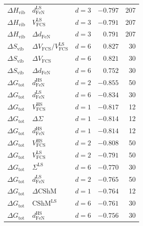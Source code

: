 \begin{longtable}{@{}lllrr@{}}
$\Delta H_{\mathrm{vib}}$ & $d_{\mathrm{FeN}}^{\mathrm{LS}}$ & $d=3$ & $-0.797$ & 207 \\
$\Delta H_{\mathrm{vib}}$ & $V_{\mathrm{FCS}}^{\mathrm{LS}}$ & $d=3$ & $-0.791$ & 207 \\
$\Delta H_{\mathrm{vib}}$ & $\Delta d_{\mathrm{FeN}}$ & $d=3$ & $0.791$ & 207 \\
\midrule
$\Delta S_{\mathrm{vib}}$ & $\Delta V_{\mathrm{FCS}}/V_{\mathrm{FCS}}^{\mathrm{LS}}$ & $d=6$ & $0.827$ & 30 \\
$\Delta S_{\mathrm{vib}}$ & $\Delta V_{\mathrm{FCS}}$ & $d=6$ & $0.821$ & 30 \\
$\Delta S_{\mathrm{vib}}$ & $\Delta d_{\mathrm{FeN}}$ & $d=6$ & $0.752$ & 30 \\
\midrule
$\Delta G_{\mathrm{tot}}$ & $d_{\mathrm{FeN}}^{\mathrm{HS}}$ & $d=2$ & $-0.855$ & 50 \\
$\Delta G_{\mathrm{tot}}$ & $d_{\mathrm{FeN}}^{\mathrm{LS}}$ & $d=6$ & $-0.834$ & 30 \\
$\Delta G_{\mathrm{tot}}$ & $V_{\mathrm{FCS}}^{\mathrm{HS}}$ & $d=1$ & $-0.817$ & 12 \\
$\Delta G_{\mathrm{tot}}$ & $\Delta\Sigma$ & $d=1$ & $-0.814$ & 12 \\
$\Delta G_{\mathrm{tot}}$ & $d_{\mathrm{FeN}}^{\mathrm{HS}}$ & $d=1$ & $-0.814$ & 12 \\
$\Delta G_{\mathrm{tot}}$ & $V_{\mathrm{FCS}}^{\mathrm{HS}}$ & $d=2$ & $-0.808$ & 50 \\
$\Delta G_{\mathrm{tot}}$ & $V_{\mathrm{FCS}}^{\mathrm{LS}}$ & $d=2$ & $-0.791$ & 50 \\
$\Delta G_{\mathrm{tot}}$ & $\Sigma^{\mathrm{LS}}$ & $d=6$ & $-0.770$ & 30 \\
$\Delta G_{\mathrm{tot}}$ & $d_{\mathrm{FeN}}^{\mathrm{LS}}$ & $d=2$ & $-0.765$ & 50 \\
$\Delta G_{\mathrm{tot}}$ & $\Delta\mathrm{CShM}$ & $d=1$ & $-0.764$ & 12 \\
$\Delta G_{\mathrm{tot}}$ & $\mathrm{CShM}^{\mathrm{LS}}$ & $d=6$ & $-0.761$ & 30 \\
$\Delta G_{\mathrm{tot}}$ & $d_{\mathrm{FeN}}^{\mathrm{HS}}$ & $d=6$ & $-0.756$ & 30 \\
\end{longtable}
\endgroup
